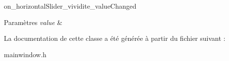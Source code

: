on\+\_\+horizontal\+Slider\+\_\+vividite\+\_\+value\+Changed 


\begin{DoxyParams}{Paramètres}
{\em value} & \\
\hline
\end{DoxyParams}


La documentation de cette classe a été générée à partir du fichier suivant \+:\begin{DoxyCompactItemize}
\item 
mainwindow.\+h\end{DoxyCompactItemize}

